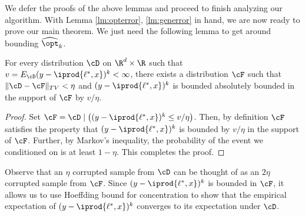 We defer the proofs of the above lemmas and proceed to finish analyzing our algorithm. With Lemma \ref{lm:opterror}, \ref{lm:generror} in hand, we are now ready to prove our main theorem. We just need the following lemma to get around bounding $\widehat{\opt}_k$. 

\begin{lemma} \label{lem:little-boundedness-fact}
For every distribution $\cD$ on $\R^d \times \R$ such that $v = E_{\cD} (y - \iprod{\ell^{*},x})^k < \infty$, there exists a distribution $\cF$ such that $\|\cD-\cF\|_{TV} < \eta$ and $(y - \iprod{\ell^{*},x})^k$ is bounded absolutely bounded in the support of $\cF$  by $v/\eta$.
\end{lemma}
\begin{proof}
Set $\cF = \cD \mid \left((y-\iprod{\ell^{*},x})^k \leq v/\eta\right)$. Then, by definition $\cF$ satisfies the property that $(y - \iprod{\ell^{*},x})^k$ is bounded by $v/\eta$ in the support of $\cF$. Further, by Markov's inequality, the probability of the event we conditioned on is at least $1-\eta$. This completes the proof.
\end{proof}

Observe that an $\eta$ corrupted sample from $\cD$ can be thought of as an $2\eta$ corrupted sample from $\cF$. Since $(y-\iprod{\ell^{*},x})^k$ is bounded in $\cF$, it allows us to use Hoeffding bound for concentration to show that the empirical expectation of $(y-\iprod{\ell^{*},x})^k$ converges to its expectation under $\cD$. 








